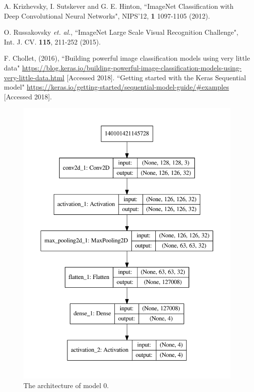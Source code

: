 \documentclass[10pt,a4paper]{article}
\begin{document}
\begin{thebibliography}{9}

 A. Krizhevsky, I. Sutskever and G. E. Hinton, ``ImageNet Classification with Deep Convolutional Neural Networks", NIPS'12, {\bf 1} 1097-1105 (2012).

 O. Russakovsky {\it et. al.}, ``ImageNet Large Scale Visual Recognition Challenge", Int. J. CV. {\bf 115}, 211-252 (2015).

F. Chollet, (2016), ``Building powerful image classification models using very little data" \url{https://blog.keras.io/building-powerful-image-classification-models-using-very-little-data.html} [Accessed 2018].
 ``Getting started with the Keras Sequential model" \url{https://keras.io/getting-started/sequential-model-guide/#examples} [Accessed 2018].


\end{thebibliography}

\newpage
\begin{figure}[h]
\centering
\includegraphics[scale=0.5]{model0_plot.pdf}
\caption{The architecture of model 0.}
\label{fig: model0}
\end{figure}
\end{document}
